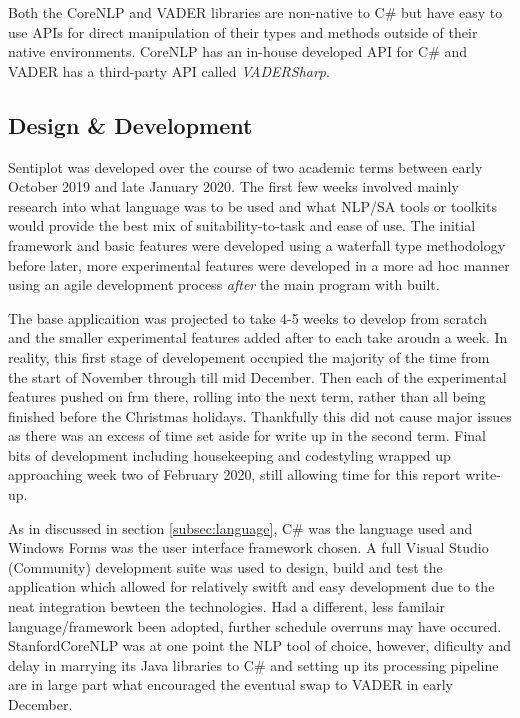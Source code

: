 \documentclass[a4paper]{article}
\begin{document}
        Both the CoreNLP and VADER libraries are non-native to C\# but have easy to use APIs for direct manipulation of their types and methods outside of their native environments. CoreNLP has an in-house developed API for C\# and VADER has a third-party API called \textit{VADERSharp}.
    \subsection{Design \& Development}
    \label{subsec:dnd}
        Sentiplot was developed over the course of two academic terms between early October 2019 and late January 2020. The first few weeks involved mainly research into what language was to be used and what NLP/SA tools or toolkits would provide the best mix of suitability-to-task and ease of use. The initial framework and basic features were developed using a waterfall type methodology before later, more experimental features were developed in a more ad hoc manner using an agile development process \textit{after} the main program with built.
        
        The base applicaition was projected to take 4-5 weeks to develop from scratch and the smaller experimental features added after to each take aroudn a week. In reality, this first stage of developement occupied the majority of the time from the start of November through till mid December. Then each of the experimental features pushed on frm there, rolling into the next term, rather than all being finished before the Christmas holidays. Thankfully this did not cause major issues as there was an excess of time set aside for write up in the second term. Final bits of development including housekeeping and codestyling wrapped up approaching week two of February 2020, still allowing time for this report write-up.

        As in discussed in section \ref{subsec:language}, C\# was the language used and Windows Forms was the user interface framework chosen. A full Visual Studio (Community) development suite was used to design, build and test the application which allowed for relatively switft and easy development due to the neat integration bewteen the technologies. Had a different, less familair language/framework been adopted, further schedule overruns may have occured. StanfordCoreNLP was at one point the NLP tool of choice, however, dificulty and delay in marrying its Java libraries to C\# and setting up its processing pipeline are in large part what encouraged the eventual swap to VADER in early December.
        
\end{document}
